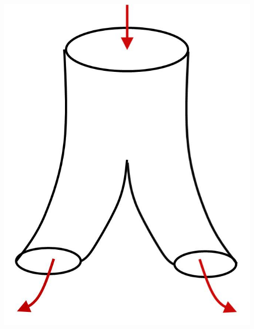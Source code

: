 \documentclass[a4paper,11pt,notitlepage]{report}
\theoremstyle{remark}
\theoremstyle{definition}
\begin{document}
\includegraphics[scale=0.4]{images/Stringtheorie.jpg}
\end{document}

